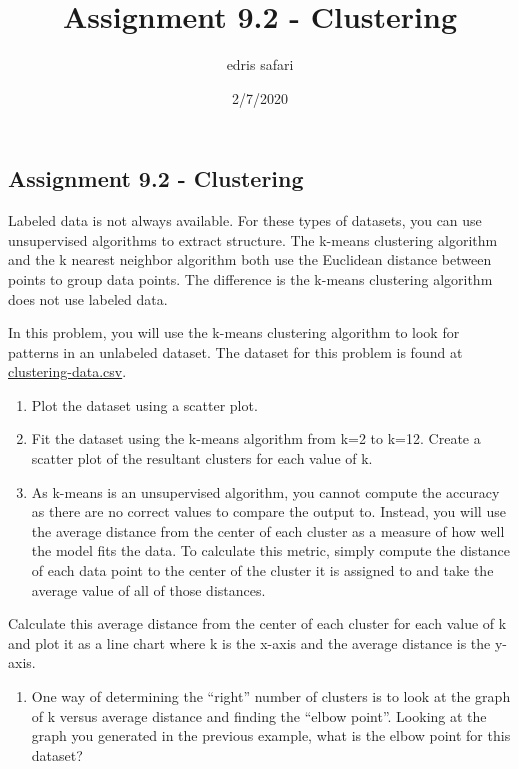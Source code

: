 \documentclass[
]{article}
\title{Assignment 9.2 - Clustering}
\author{edris safari}
\date{2/7/2020}
\providecommand{\tightlist}{%
  \setlength{\itemsep}{0pt}\setlength{\parskip}{0pt}}
\begin{document}
\maketitle

\hypertarget{assignment-9.2---clustering}{%
\subsection{Assignment 9.2 -
Clustering}\label{assignment-9.2---clustering}}

Labeled data is not always available. For these types of datasets, you
can use unsupervised algorithms to extract structure. The k-means
clustering algorithm and the k nearest neighbor algorithm both use the
Euclidean distance between points to group data points. The difference
is the k-means clustering algorithm does not use labeled data.

In this problem, you will use the k-means clustering algorithm to look
for patterns in an unlabeled dataset. The dataset for this problem is
found at \url{clustering-data.csv}.

\begin{enumerate}
\def\labelenumi{\alph{enumi}.}
\item
  Plot the dataset using a scatter plot.
\item
  Fit the dataset using the k-means algorithm from k=2 to k=12. Create a
  scatter plot of the resultant clusters for each value of k.
\item
  As k-means is an unsupervised algorithm, you cannot compute the
  accuracy as there are no correct values to compare the output to.
  Instead, you will use the average distance from the center of each
  cluster as a measure of how well the model fits the data. To calculate
  this metric, simply compute the distance of each data point to the
  center of the cluster it is assigned to and take the average value of
  all of those distances.
\end{enumerate}

Calculate this average distance from the center of each cluster for each
value of k and plot it as a line chart where k is the x-axis and the
average distance is the y-axis.

\begin{enumerate}
\def\labelenumi{\alph{enumi}.}
\setcounter{enumi}{3}
\tightlist
\item
  One way of determining the ``right'' number of clusters is to look at
  the graph of k versus average distance and finding the ``elbow
  point''. Looking at the graph you generated in the previous example,
  what is the elbow point for this dataset?
\end{enumerate}
\end{document}
